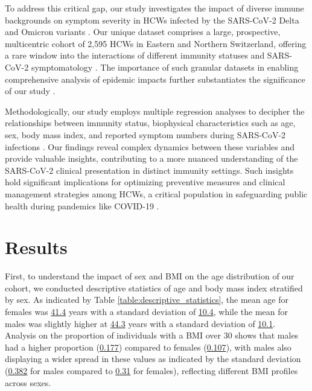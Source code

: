 \documentclass[11pt]{article}
\begin{document}
To address this critical gap, our study investigates the impact of diverse immune backgrounds on symptom severity in HCWs infected by the SARS-CoV-2 Delta and Omicron variants \cite{Nunes2022SARSCoV2OS, Vaishya2021SARSCoV2IA, Vishnoi2023SeverityAO}. Our unique dataset comprises a large, prospective, multicentric cohort of 2,595 HCWs in Eastern and Northern Switzerland, offering a rare window into the interactions of different immunity statuses and SARS-CoV-2 symptomatology \cite{Shihab2023BaDLADAL, Sarvadevabhatla2020PictionaryStyleWG, Zhong2019PubLayNetLD, Tommasi2014ATF}. The importance of such granular datasets in enabling comprehensive analysis of epidemic impacts further substantiates the significance of our study \cite{Kalervo2019CubiCasa5KAD, Ehring2008DoCM}.

Methodologically, our study employs multiple regression analyses to decipher the relationships between immunity status, biophysical characteristics such as age, sex, body mass index, and reported symptom numbers during SARS-CoV-2 infections \cite{Muslimovic2005CognitivePO, Naaijen2017GlutamatergicAG, Deblinger1993PsychosocialCA}. Our findings reveal complex dynamics between these variables and provide valuable insights, contributing to a more nuanced understanding of the SARS-CoV-2 clinical presentation in distinct immunity settings. Such insights hold significant implications for optimizing preventive measures and clinical management strategies among HCWs, a critical population in safeguarding public health during pandemics like COVID-19 \cite{Swanson2017YoungAO}.

\section*{Results}
First, to understand the impact of sex and BMI on the age distribution of our cohort, we conducted descriptive statistics of age and body mass index stratified by sex. As indicated by Table \ref{table:descriptive_statistics}, the mean age for females was \hyperlink{A0a}{41.4} years with a standard deviation of \hyperlink{A0b}{10.4}, while the mean for males was slightly higher at \hyperlink{A1a}{44.3} years with a standard deviation of \hyperlink{A1b}{10.1}. Analysis on the proportion of individuals with a BMI over 30 shows that males had a higher proportion (\hyperlink{A1c}{0.177}) compared to females (\hyperlink{A0c}{0.107}), with males also displaying a wider spread in these values as indicated by the standard deviation (\hyperlink{A1d}{0.382} for males compared to \hyperlink{A0d}{0.31} for females), reflecting different BMI profiles across sexes.
\end{document}
